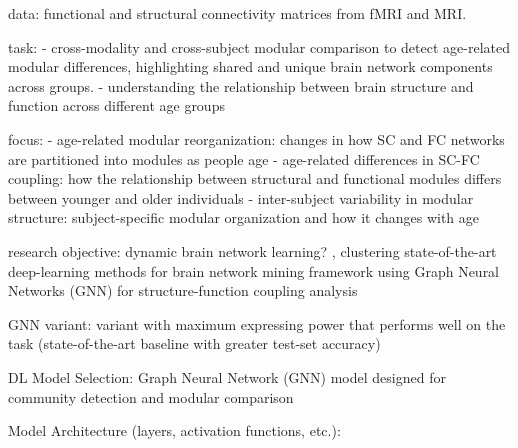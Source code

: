 data: functional and structural connectivity matrices from fMRI and MRI. 

task: 
- cross-modality and cross-subject modular comparison 
to detect age-related modular differences, highlighting shared 
and unique brain network components across groups. 
-  understanding the relationship between brain structure and function 
across different age groups

focus: 
- age-related modular reorganization: changes in how SC and FC networks are partitioned 
    into modules as people age
- age-related differences in SC-FC coupling: how the relationship between structural and 
    functional modules differs between younger and older individuals
- inter-subject variability in modular structure: subject-specific modular organization 
    and how it changes with age
\cite{Puxeddu2022}

research objective: 
dynamic brain network learning? \cite{Tang2023}, 
clustering
state-of-the-art deep-learning methods for brain network mining
framework using Graph Neural Networks (GNN) for structure-function coupling analysis

GNN variant: variant with maximum expressing power that performs
well on the task (state-of-the-art baseline with greater test-set
accuracy)

DL Model Selection: Graph Neural Network (GNN) model designed for 
community detection and modular comparison

Model Architecture (layers, activation functions, etc.):




